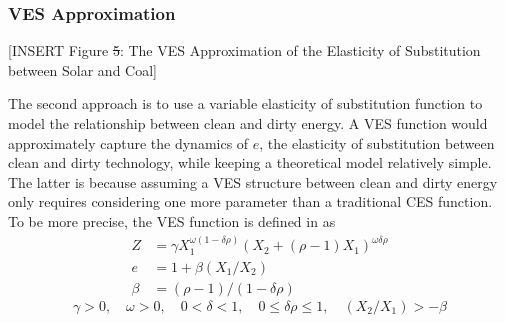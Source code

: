 \documentclass[11pt,a4paper,leqno]{extarticle}
\providecommand{\DIFadd}[1]{{\protect\color{blue}\uwave{#1}}} %
\providecommand{\DIFdel}[1]{{\protect\color{red}\sout{#1}}}                      %
\providecommand{\DIFaddbegin}{} %
\providecommand{\DIFaddend}{} %
\providecommand{\DIFdelbegin}{} %
\providecommand{\DIFdelend}{} %
\begin{document}
	\subsubsection{VES Approximation}
	\DIFaddbegin \label{sec:VES}
	\DIFaddend 
	
	
	\vspace{0.15in}
	\begin{center}
		[INSERT Figure \DIFdelbegin \DIFdel{5}\DIFdelend \DIFaddbegin \DIFadd{4}\DIFaddend : The VES Approximation of the Elasticity of Substitution between Solar and Coal]
	\end{center}
	\vspace{0.15in}
	
	
	The second approach is to use a variable elasticity of substitution function to model the relationship between clean and dirty energy.  A VES function would approximately capture the dynamics of $e$, the elasticity of substitution between clean and dirty technology,  while keeping a theoretical model relatively simple. The latter is because assuming a VES structure between clean and dirty energy only requires considering one more parameter than a traditional CES function. To be more precise, the VES function is defined in \citet{VES} as
	\begin{align}
	Z &= \gamma X_1^{\omega(1-\delta \rho)} \left( X_2 + (\rho - 1) X_1 \right)^{\omega \delta \rho} \\
	e &= 1 + \beta (X_1 / X_2) \\
	\beta &= (\rho - 1) / ( 1- \delta \rho ) 
	\end{align}
	$$\gamma > 0, \quad \omega > 0, \quad0 < \delta < 1, \quad 0 \leq \delta \rho \leq 1 , \quad (X_2/X_1) >  -\beta $$
\end{document}
